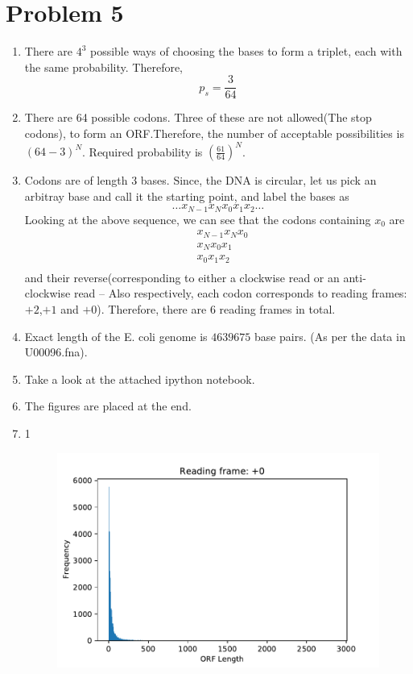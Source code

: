 \documentclass[a4paper]{article}
\begin{document}
\section{Problem 5}
\begin{enumerate}[label=(\alph*)]
    \item There are $4^3$ possible ways of choosing the bases to form a triplet, each with the same probability. Therefore, $$p_{s}=\frac{3}{64}$$
	\item There are 64 possible codons. Three of these are not allowed(The stop codons), to form an ORF.Therefore, the number of acceptable possibilities is $(64-3)^{N}$.\newline
	Required probability is $\left(\frac{61}{64}\right)^{N}$.
	\item Codons are of length $3$ bases. Since, the DNA is circular, let us pick an arbitray base and call it the starting point, and label the bases as $$\dots x_{N-1}x_{N}x_{0}x_{1}x_{2}\dots$$
    Looking at the above sequence, we can see that the codons containing $x_{0}$ are
    \begin{align*}
        & x_{N-1}x_{N}x_{0} \\
        & x_{N}x_{0}x_{1} \\
        & x_{0}x_{1}x_{2} \\
    \end{align*} and their reverse(corresponding to either a clockwise read or an anti-clockwise read -- Also respectively, each codon corresponds to reading frames: $+2$,$+1$ and $+0$). Therefore, there are $6$ reading frames in total. 
    \item Exact length of the E. coli genome is $4639675$ base pairs. (As per the data in U00096.fna).
    \item Take a look at the attached ipython notebook.
    \item The figures are placed at the end. 
    \item 1
    \begin{figure}
        \includegraphics{q5f0.pdf}

\end{figure}
\end{enumerate}
\end{document}
